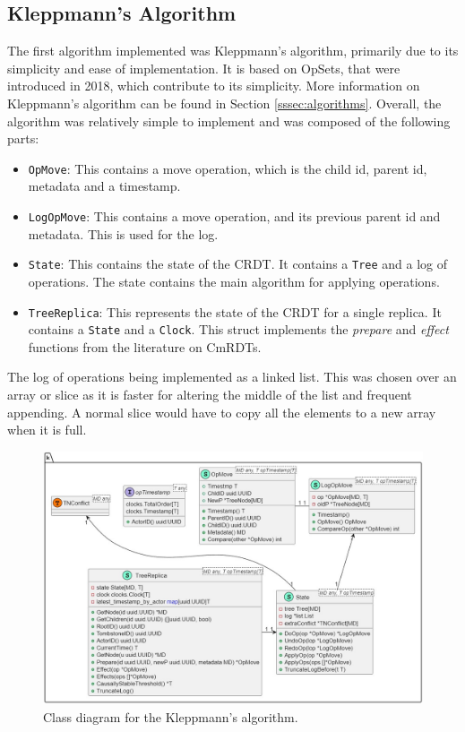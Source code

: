 \documentclass[12pt]{report}
\begin{document}
\subsection{Kleppmann's Algorithm}
The first algorithm implemented was Kleppmann's algorithm, primarily due to its simplicity and ease of implementation. It is based on OpSets, that were introduced in 2018\cite{https://doi.org/10.48550/arxiv.1805.04263}, which contribute to its simplicity. More information on Kleppmann's algorithm can be found in Section \ref{sssec:algorithms}. Overall, the algorithm was relatively simple to implement and was composed of the following parts:
\begin{itemize}
    \item \texttt{OpMove}: This contains a move operation, which is the child id, parent id, metadata and a timestamp.
    \item \texttt{LogOpMove}: This contains a move operation, and its previous parent id and metadata. This is used for the log.
    \item \texttt{State}: This contains the state of the CRDT. It contains a \texttt{Tree} and a log of operations. The state contains the main algorithm for applying operations.
    \item \texttt{TreeReplica}: This represents the state of the CRDT for a single replica. It contains a \texttt{State} and a \texttt{Clock}. This struct implements the \textit{prepare} and \textit{effect} functions from the literature on CmRDTs.
\end{itemize}

The log of operations being implemented as a linked list. This was chosen over an array or slice as it is faster for altering the middle of the list and frequent appending. A normal slice would have to copy all the elements to a new array when it is full. \par

\begin{figure}[H]
    \centering
    \includegraphics[width=1\textwidth]{images/kleppmann_impl2.jpg} 
    \caption{Class diagram for the Kleppmann's algorithm.}
    \label{fig:kleppmann_impl} 
\end{figure} 
\end{document}

